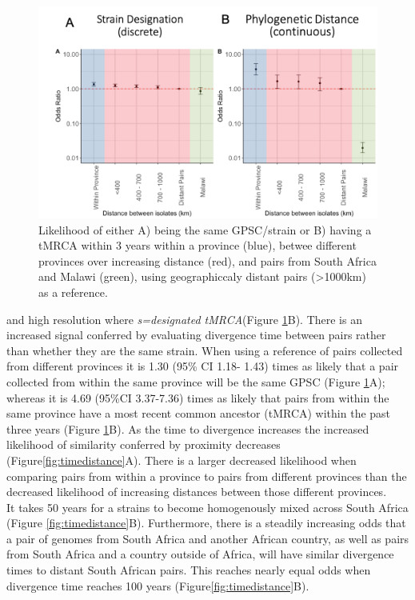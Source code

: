 \documentclass{article}
\begin{document}
\begin{figure}[H]
\centering
    \includegraphics[width=\textwidth]{strainvstmrca.png}
    \caption{Likelihood of either A) being the same GPSC/strain or B) having a tMRCA within 3 years within a province (blue), betwee different provinces over increasing distance (red), and pairs from South Africa and Malawi (green), using geographiccaly distant pairs (>1000km) as a reference.}
      \label{fig:strainvstmrca}
\end{figure}
and high resolution where \textit{s=designated tMRCA}(Figure \ref{fig:strainvstmrca}B).  There is an increased signal conferred by evaluating divergence time between pairs rather than whether they are the same strain. When using a reference of pairs collected from different provinces it is 1.30 (95\% CI 1.18- 1.43) times as likely that a pair collected from within the same province will be the same GPSC (Figure \ref{fig:strainvstmrca}A); whereas it is 4.69 (95\%CI 3.37-7.36) times as likely that pairs from within the same province have a most recent common ancestor (tMRCA) within the past three years (Figure \ref{fig:strainvstmrca}B). As the time to divergence increases the increased likelihood of similarity conferred by proximity decreases (Figure\ref{fig:timedistance}A). There is a larger decreased likelihood when comparing pairs from within a province to pairs from different provinces than the decreased likelihood of increasing distances between those different provinces. \\It takes 50 years for a strains to become homogenously mixed across South Africa (Figure \ref{fig:timedistance}B). Furthermore, there is  a steadily increasing odds that a pair of genomes from South Africa and another African country, as well as pairs from South Africa and a country outside of Africa, will have similar divergence times to distant South African pairs. This reaches nearly equal odds when divergence time reaches 100 years (Figure\ref{fig:timedistance}B). 
\end{document}
